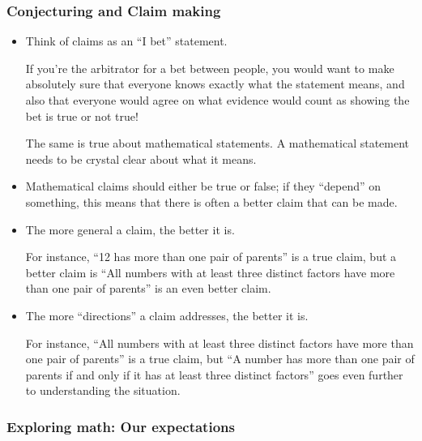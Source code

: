 \documentclass[11pt]{article}
\theoremstyle{definition}
\begin{document}
\subsubsection*{Conjecturing and Claim making}

\begin{itemize}
\item Think of claims as an ``I bet'' statement. 

If you're the arbitrator for a bet between people, you would want to make absolutely sure that everyone knows exactly what the statement means, and also that everyone would agree on what evidence would count as showing the bet is true or not true! 

The same is true about mathematical statements. A mathematical statement needs to be crystal clear about what it means.

\item Mathematical claims should either be true or false; if they ``depend'' on something, this means that there is often a better claim that can be made. 

\item The more general a claim, the better it is. 

For instance, ``12 has more than one pair of parents'' is a true claim, but a better claim is ``All numbers with at least three distinct factors have more than one pair of parents'' is an even better claim.

\item The more ``directions'' a claim addresses, the better it is. 

For instance, ``All numbers with at least three distinct factors have more than one pair of parents'' is a true claim, but ``A number has more than one pair of parents if and only if it has at least three distinct factors'' goes even further to understanding the situation.
\end{itemize}

\subsubsection*{Exploring math: Our expectations}
\end{document}
